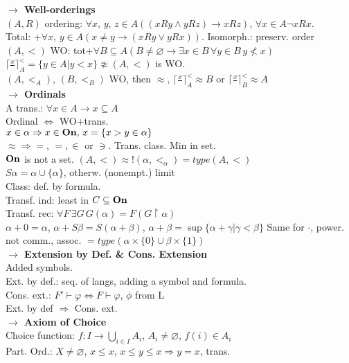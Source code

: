 \documentclass[9pt]{article}
\newcommand{\class}[1]{{\bf #1}}
\newcommand{\mytitle}[1]{ {\bf $\rightarrow$ #1}\\}
\newcommand{\On}{\class{On}}
\begin{document}
\begin{multicols*}{2}
\mytitle{Well-orderings}
$(A,R)$ ordering: $\forall x,\,y,\,z\in A\left((xRy\wedge yRz)\to xRz\right)$,
$\forall x\in A\neg xRx$.\\
Total: +$\forall x,\,y\in A\left(x\neq y\to(xRy\vee yRx)\right)$.
Isomorph.: preserv. order\\
$(A,<)$ WO: tot+$\forall B\subseteq A\left(B\neq \varnothing\to \exists x\in B\,\forall y\in B\,y\nless x\right)$\\
$\lceil \frac{x}{\,}\rceil_A^<=\{y\in A|y<x\}\not\approx (A,<)$ is WO.\\
$(A,<_A),\,(B,<_B)$ WO, then $\approx$, $\lceil \frac{x}{\,}\rceil_A^<\approx B$ or $\lceil \frac{x}{\,}\rceil_B^<\approx A$\\
\mytitle{Ordinals}
A trans.: $\forall x\in A\to x\subseteq A$\\
Ordinal $\Leftrightarrow$ WO+trans.\\
$x\in \alpha\Rightarrow x\in \On,\,x=\{x>y\in \alpha\}$\\
$\approx\Rightarrow=$, $=,\in$ or $\ni$. Trans. class. Min in set.\\
$\On$ is not a set. $(A,<)\approx !(\alpha,<_\alpha)=type(A,<)$\\
$S\alpha=\alpha\cup\{\alpha\}$, otherw. (nonempt.) limit\\
Class: def. by formula.\\
Transf. ind: least in $C\subseteq \On$\\
Transf. rec: $\forall F\,\exists G\,G(\alpha)=F(G\upharpoonright\alpha)$\\
$\alpha+0=\alpha$, $\alpha+S\beta=S(\alpha+\beta)$, $\alpha+\beta=\sup\{\alpha+\gamma|\gamma<\beta\}$
Same for $\cdot$, power.\\
not comm., assoc. $=type(\alpha\times\{0\}\cup\beta\times\{1\})$\\
\mytitle{Extension by Def. \& Cons. Extension}
Added symbols.\\
Ext. by def.: seq. of langs, adding a symbol and formula.\\
Cons. ext.: $F'\vdash \varphi\Leftrightarrow F\vdash\varphi$, $\phi$ from L\\
Ext. by def $\Rightarrow$ Cons. ext.\\
\mytitle{Axiom of Choice}
Choice function: $f\colon I\to \bigcup\limits_{i\in I}A_i$, $A_i\neq\varnothing$, $f(i)\in A_i$\\
Part. Ord.: $X\neq\varnothing$, $x\leqslant x$, $x\leqslant y\leqslant x\Rightarrow y=x$, trans.\\

\end{multicols*}
\end{document}
